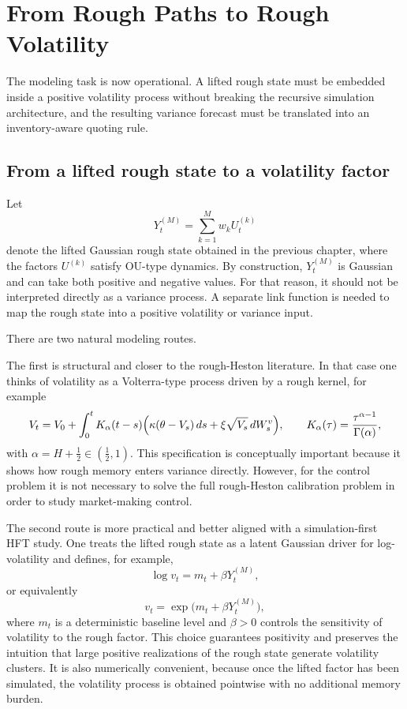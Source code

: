 \section{From Rough Paths to Rough Volatility}


The modeling task is now operational. A lifted rough state must be embedded inside a positive volatility process without breaking the recursive simulation architecture, and the resulting variance forecast must be translated into an inventory-aware quoting rule.

\subsection{From a lifted rough state to a volatility factor}

Let
\[
Y_t^{(M)}=\sum_{k=1}^M w_k U_t^{(k)}
\]
denote the lifted Gaussian rough state obtained in the previous chapter, where the factors \(U^{(k)}\) satisfy OU-type dynamics. By construction, \(Y_t^{(M)}\) is Gaussian and can take both positive and negative values. For that reason, it should not be interpreted directly as a variance process. A separate link function is needed to map the rough state into a positive volatility or variance input.

There are two natural modeling routes.

The first is structural and closer to the rough-Heston literature. In that case one thinks of volatility as a Volterra-type process driven by a rough kernel, for example
\[
V_t
=
V_0
+
\int_0^t
K_\alpha(t-s)
\Bigl(
\kappa(\theta-V_s)\,ds
+
\xi\sqrt{V_s}\,dW_s^v
\Bigr),
\qquad
K_\alpha(\tau)=\frac{\tau^{\alpha-1}}{\Gamma(\alpha)},
\]
with \(\alpha=H+\tfrac12\in(\tfrac12,1)\). This specification is conceptually important because it shows how rough memory enters variance directly. However, for the control problem it is not necessary to solve the full rough-Heston calibration problem in order to study market-making control.

The second route is more practical and better aligned with a simulation-first HFT study. One treats the lifted rough state as a latent Gaussian driver for log-volatility and defines, for example,
\[
\log v_t = m_t + \beta Y_t^{(M)},
\]
or equivalently
\[
v_t = \exp\!\bigl(m_t+\beta Y_t^{(M)}\bigr),
\]
where \(m_t\) is a deterministic baseline level and \(\beta>0\) controls the sensitivity of volatility to the rough factor. This choice guarantees positivity and preserves the intuition that large positive realizations of the rough state generate volatility clusters. It is also numerically convenient, because once the lifted factor has been simulated, the volatility process is obtained pointwise with no additional memory burden.

